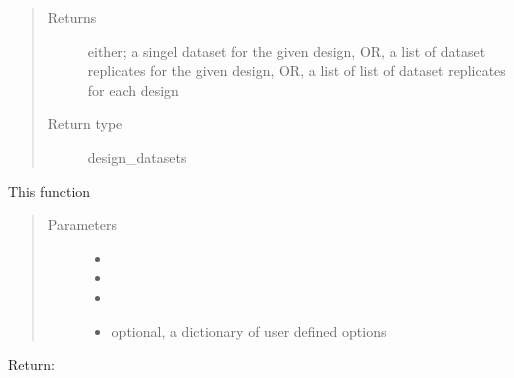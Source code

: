 \documentclass[letterpaper,10pt,english,openany,oneside]{sphinxmanual}
\begin{document}
\begin{fulllineitems}
\begin{fulllineitems}
\begin{quote}
\begin{description}
\item[{Returns}] \leavevmode
either; a singel dataset for the given design,  OR,  a list of dataset replicates for the given design,  OR,  a list of list of dataset replicates for each design

\item[{Return type}] \leavevmode
design\_datasets

\end{description}\end{quote}

\end{fulllineitems}


\begin{fulllineitems}
\label{\detokenize{nloed:nloed.model.Model.predict}}
This function
\begin{quote}\begin{description}
\item[{Parameters}] \leavevmode\begin{itemize}
\item {} 
 \textendash{} 

\item {} 
 \textendash{} 

\item {} 
 \textendash{} 

\item {} 
 \textendash{} optional,  a dictionary of user defined options

\end{itemize}

\end{description}\end{quote}

Return:

\end{fulllineitems}



\end{fulllineitems}
\end{document}
